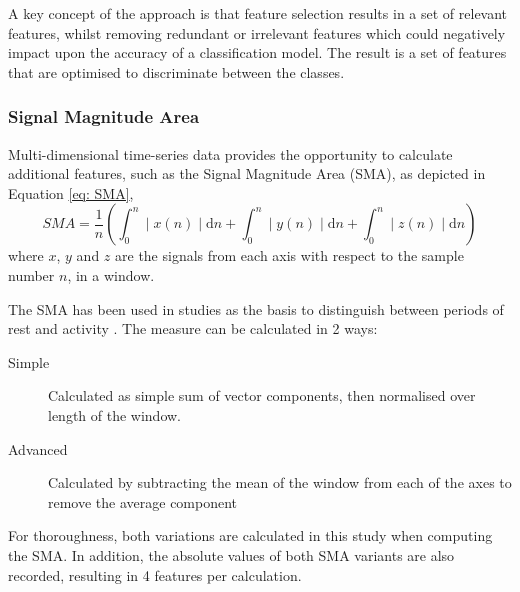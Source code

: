 A key concept of the approach is that feature selection results in a set of relevant features, whilst removing redundant or irrelevant features which could negatively impact upon the accuracy of a classification model. The result is a set of features that are optimised to discriminate between the classes.

\subsubsection{Signal Magnitude Area}
Multi-dimensional time-series data provides the opportunity to calculate additional features, such as the Signal Magnitude Area (SMA), as depicted in Equation \ref{eq: SMA},
\begin{equation}
SMA =\frac{1}{n} \left(\int_{0}^{n} \mid x(n)\mid \text{d} n + \int_{0}^{n} \mid y(n)\mid \text{d} n + \int_{0}^{n} \mid z(n)\mid \text{d} n  \right)
\label{eq: SMA}
\end{equation}
where $x$, $y$ and $z$ are the signals from each axis with respect to the sample number $n$, in a window.

The SMA has been used in studies as the basis to distinguish between periods of rest and activity \cite{Mathie2004, Karantonis2006}. The measure can be calculated in 2 ways:
\begin{description}
	\item [Simple] Calculated as simple sum of vector components, then normalised over length of the window.
	\item [Advanced] Calculated by subtracting the mean of the window from each of the axes to remove the average component
\end{description}

For thoroughness, both variations are calculated in this study when computing the SMA. In addition, the absolute values of both SMA variants are also recorded, resulting in 4 features per calculation.

